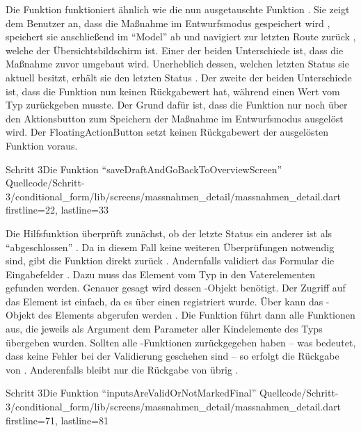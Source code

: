 Die Funktion  funktioniert ähnlich wie die nun ausgetauschte Funktion .
Sie zeigt dem Benutzer an, dass die Maßnahme im Entwurfsmodus gespeichert wird , speichert sie anschließend im \enquote{Model} ab  und navigiert zur letzten Route zurück , welche der Übersichtsbildschirm ist.
Einer der beiden Unterschiede ist, dass die Maßnahme zuvor umgebaut wird.
Unerheblich dessen, welchen letzten Status sie aktuell besitzt, erhält sie den letzten Status  .
Der zweite der beiden Unterschiede ist, dass die Funktion nun keinen Rückgabewert hat, während  einen Wert vom Typ  zurückgeben musste.
Der Grund dafür ist, dass die Funktion nur noch über den Aktionsbutton zum Speichern der Maßnahme im Entwurfsmodus ausgelöst wird. Der FloatingActionButton setzt keinen Rückgabewert der ausgelösten Funktion voraus.

\begin{alexlisting}{Schritt 3}{Die Funktion \enquote{saveDraftAndGoBackToOverviewScreen}}
    {Quellcode/Schritt-3/conditional_form/lib/screens/massnahmen_detail/massnahmen_detail.dart}
    {firstline=22, lastline=33}
    \label{lst:Schritt3saveDraftAndGoBackToOverviewScreen}
\end{alexlisting}

Die Hilfsfunktion  überprüft zunächst, ob der letzte Status ein anderer ist als \enquote{abgeschlossen} .
Da in diesem Fall keine weiteren Überprüfungen notwendig sind, gibt die Funktion direkt  zurück .
Andernfalls validiert das Formular die Eingabefelder .
Dazu muss das Element vom Typ  in den Vaterelementen gefunden werden.
Genauer gesagt wird dessen -Objekt benötigt.
Der Zugriff auf das Element ist einfach, da es über einen  registriert wurde.
Über  kann das -Objekt des Elements abgerufen werden .
Die Funktion  führt dann alle Funktionen aus, die jeweils als Argument dem Parameter  aller Kindelemente des Typs  übergeben wurden.
Sollten alle -Funktionen  zurückgegeben haben -- was bedeutet, dass keine Fehler bei der Validierung geschehen sind -- so erfolgt die Rückgabe von  .
Anderenfalls bleibt nur die Rückgabe von  übrig .

\begin{alexlisting}{Schritt 3}{Die Funktion \enquote{inputsAreValidOrNotMarkedFinal}}
    {Quellcode/Schritt-3/conditional_form/lib/screens/massnahmen_detail/massnahmen_detail.dart}
    {firstline=71, lastline=81}
    \label{lst:Schritt3inputsAreValidOrNotMarkedFinal}
\end{alexlisting}

